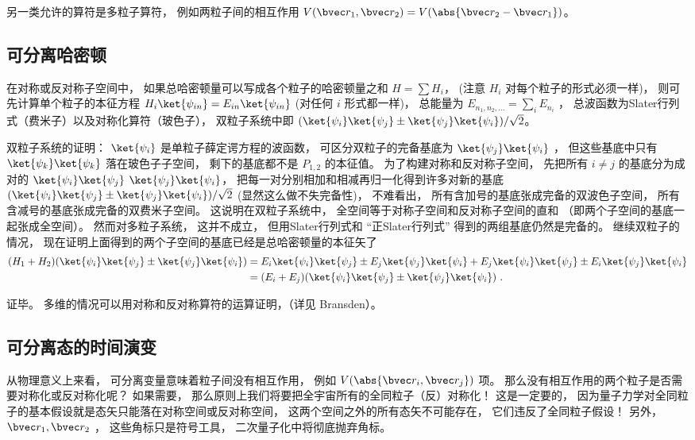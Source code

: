 另一类允许的算符是多粒子算符， 例如两粒子间的相互作用 $V(\bvec r_1, \bvec r_2) = V(\abs{\bvec r_2 - \bvec r_1})$。

\subsection{可分离哈密顿}
在对称或反对称子空间中， 如果总哈密顿量可以写成各个粒子的哈密顿量之和 $H = \sum H_i$， (注意 $H_i$ 对每个粒子的形式必须一样)， 则可先计算单个粒子的本征方程 $H_i \ket{\psi_{in}} = E_{in}\ket{\psi_{in}}$ (对任何 $i$ 形式都一样)， 总能量为 $E_{n_1,n_2,\dots} = \sum_i E_{n_i}$ ， 总波函数为Slater行列式（费米子）以及对称化算符（玻色子）， 双粒子系统中即 $(\ket{\psi_i}\ket{\psi_j} \pm \ket{\psi_j}\ket{\psi_i})/\sqrt{2}$。

双粒子系统的证明： $\ket{\psi_i}$ 是单粒子薛定谔方程的波函数， 可区分双粒子的完备基底为 $\ket{\psi_j}\ket{\psi_i}$ ， 但这些基底中只有 $\ket{\psi_k}\ket{\psi_k}$ 落在玻色子子空间， 剩下的基底都不是 $P_{1,2}$ 的本征值。 为了构建对称和反对称子空间， 先把所有 $i \ne j$ 的基底分为成对的 $\ket{\psi_i}\ket{\psi_j}$ $\ket{\psi_j}\ket{\psi_i}$， 把每一对分别相加和相减再归一化得到许多对新的基底 $(\ket{\psi_i}\ket{\psi_j} \pm \ket{\psi_j}\ket{\psi_i})/\sqrt{2}$ (显然这么做不失完备性)， 不难看出， 所有含加号的基底张成完备的双波色子空间， 所有含减号的基底张成完备的双费米子空间。 这说明在双粒子系统中， 全空间等于对称子空间和反对称子空间的直和 （即两个子空间的基底一起张成全空间）。 然而对多粒子系统， 这并不成立， 但用Slater行列式和 “正Slater行列式” 得到的两组基底仍然是完备的。 继续双粒子的情况， 现在证明上面得到的两个子空间的基底已经是总哈密顿量的本征矢了
\begin{equation}
\begin{aligned}
(H_1 + H_2) (\ket{\psi_i}\ket{\psi_j} \pm \ket{\psi_j}\ket{\psi_i}) &= E_i \ket{\psi_i}\ket{\psi_j} \pm E_j \ket{\psi_j}\ket{\psi_i} + E_j \ket{\psi_i}\ket{\psi_j} \pm E_i \ket{\psi_j}\ket{\psi_i}\\
&= (E_i + E_j) (\ket{\psi_i}\ket{\psi_j} \pm \ket{\psi_j}\ket{\psi_i})~.
\end{aligned}
\end{equation}

证毕。
多维的情况可以用对称和反对称算符的运算证明，（详见 Bransden）。

\subsection{可分离态的时间演变}
从物理意义上来看， 可分离变量意味着粒子间没有相互作用， 例如 $V(\abs{\bvec r_i, \bvec r_j})$ 项。 那么没有相互作用的两个粒子是否需要对称化或反对称化呢？ 如果需要， 那么原则上我们将要把全宇宙所有的全同粒子（反）对称化！ 这是一定要的， 因为量子力学对全同粒子的基本假设就是态矢只能落在对称空间或反对称空间， 这两个空间之外的所有态矢不可能存在， 它们违反了全同粒子假设！ 另外， $\bvec r_1, \bvec r_2$ ， 这些角标只是符号工具， 二次量子化中将彻底抛弃角标。

